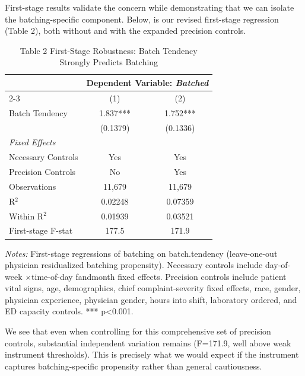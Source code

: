 \documentclass[11pt]{article}
\newcommand{\1}{\hbox{\rm 1\kern-.35em 1}}
\begin{document}
First-stage results validate the concern while demonstrating that we can isolate the batching-specific component. Below, is our revised first-stage regression (Table 2), both without and with the expanded precision controls.

\begin{table}[t!]
\centering
\caption*{Table 2 \hspace{5mm} First-Stage Robustness: Batch Tendency Strongly Predicts Batching}
\begin{threeparttable}
\begin{tabular}{lcc}
\toprule 
& \multicolumn{2}{c}{Dependent Variable: \textit{Batched}}\\
\cmidrule(lr){2-3}
& (1) & (2) \\
\midrule
Batch Tendency 
    & 1.837*** & 1.752*** \\
    & (0.1379) & (0.1336) \\
\midrule
\textit{Fixed Effects} \\
Necessary Controls & Yes & Yes \\
Precision Controls & No & Yes \\
\midrule
Observations & 11{,}679 & 11{,}679 \\
R$^2$ & 0.02248 & 0.07359 \\
Within R$^2$ & 0.01939 & 0.03521 \\
First-stage F-stat & 177.5 & 171.9 \\
\bottomrule
\end{tabular}
\begin{flushleft}
\footnotesize
\textit{Notes:} First-stage regressions of batching on batch.tendency (leave-one-out physician residualized batching propensity). Necessary controls include day-of-week $\times$time-of-day fandmonth fixed effects. Precision controls include patient vital signs, age, demographics, chief complaint-severity fixed effects, race, gender, physician experience, physician gender, hours into shift, laboratory ordered, and ED capacity controls. *** p<0.001.
\end{flushleft}
\end{threeparttable}
\end{table}

We see that even when controlling for this comprehensive set of precision controls, substantial independent variation remains (F=171.9, well above weak instrument thresholds). This is precisely what we would expect if the instrument captures batching-specific propensity rather than general cautiousness.
\end{document}
